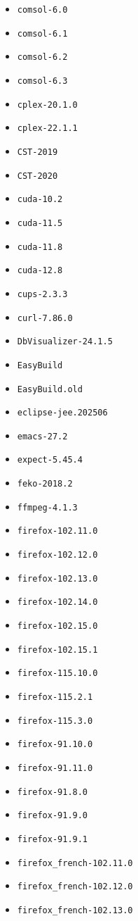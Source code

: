 \begin{multicols}{3}
\begin{itemize}
\item \verb|comsol-6.0|
\item \verb|comsol-6.1|
\item \verb|comsol-6.2|
\item \verb|comsol-6.3|
\item \verb|cplex-20.1.0|
\item \verb|cplex-22.1.1|
\item \verb|CST-2019|
\item \verb|CST-2020|
\item \verb|cuda-10.2|
\item \verb|cuda-11.5|
\item \verb|cuda-11.8|
\item \verb|cuda-12.8|
\item \verb|cups-2.3.3|
\item \verb|curl-7.86.0|
\item \verb|DbVisualizer-24.1.5|
\item \verb|EasyBuild|
\item \verb|EasyBuild.old|
\item \verb|eclipse-jee.202506|
\item \verb|emacs-27.2|
\item \verb|expect-5.45.4|
\item \verb|feko-2018.2|
\item \verb|ffmpeg-4.1.3|
\item \verb|firefox-102.11.0|
\item \verb|firefox-102.12.0|
\item \verb|firefox-102.13.0|
\item \verb|firefox-102.14.0|
\item \verb|firefox-102.15.0|
\item \verb|firefox-102.15.1|
\item \verb|firefox-115.10.0|
\item \verb|firefox-115.2.1|
\item \verb|firefox-115.3.0|
\item \verb|firefox-91.10.0|
\item \verb|firefox-91.11.0|
\item \verb|firefox-91.8.0|
\item \verb|firefox-91.9.0|
\item \verb|firefox-91.9.1|
\item \verb|firefox_french-102.11.0|
\item \verb|firefox_french-102.12.0|
\item \verb|firefox_french-102.13.0|

\end{itemize}
\end{multicols}
